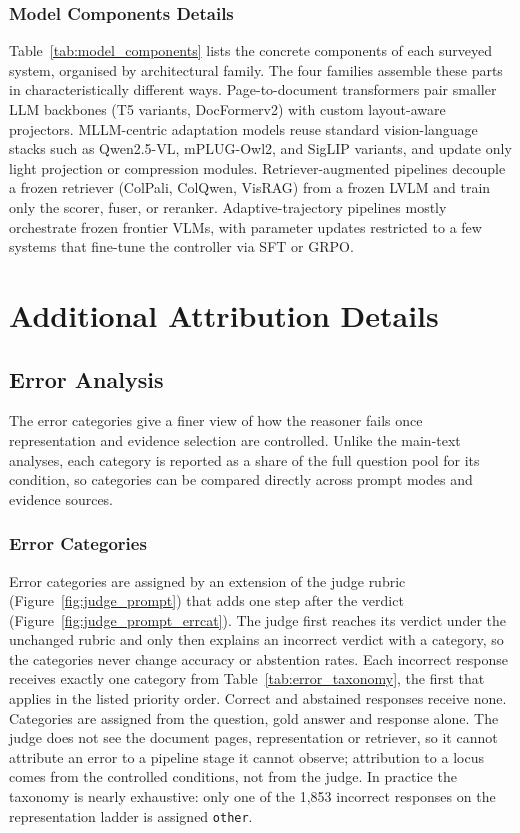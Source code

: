 \subsection{Model Components Details}
\label{app:components}
Table~\ref{tab:model_components} lists the concrete components of each surveyed system, organised by architectural family. The four families assemble these parts in characteristically different ways. Page-to-document transformers pair smaller LLM backbones (T5 variants, DocFormerv2) with custom layout-aware projectors. MLLM-centric adaptation models reuse standard vision-language stacks such as Qwen2.5-VL, mPLUG-Owl2, and SigLIP variants, and update only light projection or compression modules. Retriever-augmented pipelines decouple a frozen retriever (ColPali, ColQwen, VisRAG) from a frozen LVLM and train only the scorer, fuser, or reranker. Adaptive-trajectory pipelines mostly orchestrate frozen frontier VLMs, with parameter updates restricted to a few systems that fine-tune the controller via SFT or GRPO.



\clearpage
\chapter{Additional Attribution Details}

\section{Error Analysis}
\label{app:error_analysis}
\label{sec:emp_error_analysis}

The error categories give a finer view of how the reasoner fails once representation and evidence selection are controlled. Unlike the main-text analyses, each category is reported as a share of the full question pool for its condition, so categories can be compared directly across prompt modes and evidence sources.

\subsection{Error Categories}
\label{app:error_categories}

Error categories are assigned by an extension of the judge rubric (Figure~\ref{fig:judge_prompt}) that adds one step after the verdict (Figure~\ref{fig:judge_prompt_errcat}). The judge first reaches its verdict under the unchanged rubric and only then explains an incorrect verdict with a category, so the categories never change accuracy or abstention rates. Each incorrect response receives exactly one category from Table~\ref{tab:error_taxonomy}, the first that applies in the listed priority order. Correct and abstained responses receive none. Categories are assigned from the question, gold answer and response alone. The judge does not see the document pages, representation or retriever, so it cannot attribute an error to a pipeline stage it cannot observe; attribution to a locus comes from the controlled conditions, not from the judge. In practice the taxonomy is nearly exhaustive: only one of the 1,853 incorrect responses on the representation ladder is assigned \texttt{other}.

